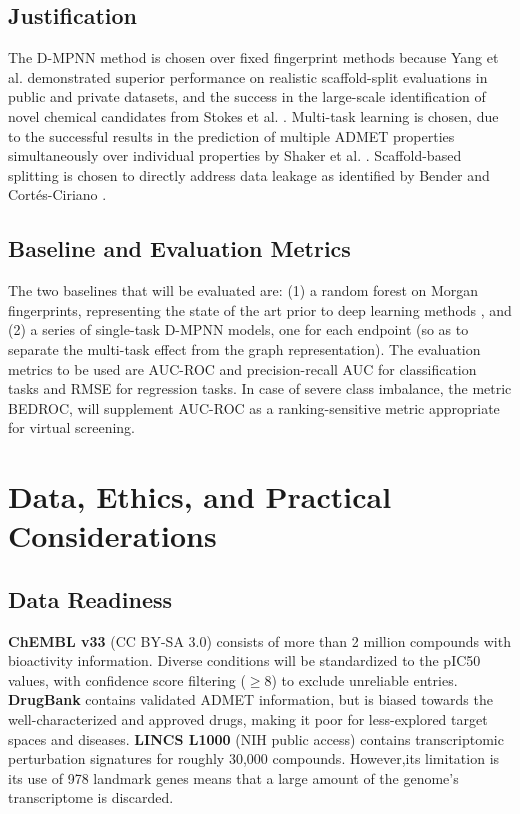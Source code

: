 \documentclass[conference]{IEEEtran}
\begin{document}
\subsection{Justification}
The D-MPNN method is chosen over fixed fingerprint methods because Yang et al. \cite{b5} demonstrated superior performance on realistic scaffold-split evaluations in public and private datasets, and the success in the large-scale identification of novel chemical candidates from Stokes et al. \cite{b11}. Multi-task learning is chosen, due to the successful results in the prediction of multiple ADMET properties simultaneously over individual properties by Shaker et al. \cite{b7}. Scaffold-based splitting is chosen to directly address data leakage as identified by Bender and Cort\'{e}s-Ciriano \cite{b4}.
 
\subsection{Baseline and Evaluation Metrics}
 
The two baselines that will be evaluated are: (1) a random forest on Morgan fingerprints, representing the state of the art prior to deep learning methods \cite{b3}, and (2) a series of single-task D-MPNN models, one for each endpoint (so as to separate the multi-task effect from the graph representation). The evaluation metrics to be used are AUC-ROC and precision-recall AUC for classification tasks and RMSE for regression tasks. In case of severe class imbalance, the metric BEDROC, will supplement AUC-ROC as a ranking-sensitive metric appropriate for virtual screening.

\section{Data, Ethics, and Practical Considerations} 
\subsection{Data Readiness}
 
\textbf{ChEMBL v33} (CC BY-SA 3.0) consists of more than 2 million compounds with bioactivity information. Diverse conditions will be standardized to the pIC50 values, with confidence score filtering ($\geq$8) to exclude unreliable entries. \textbf{DrugBank} contains validated ADMET information, but is biased towards the well-characterized and approved drugs, making it poor for less-explored target spaces and diseases. \textbf{LINCS L1000} (NIH public access) contains transcriptomic perturbation signatures for roughly 30,000 compounds. However,its limitation is its use of 978 landmark genes means that a large amount of the genome's transcriptome is discarded.
 
\end{document}
